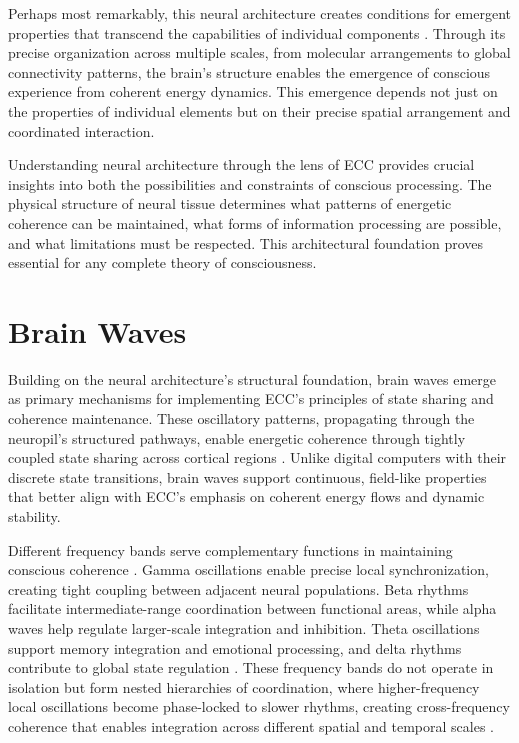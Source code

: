 \begin{refsection}
Perhaps most remarkably, this neural architecture creates conditions for emergent properties that transcend the capabilities of individual components \cite{vonBartheld2016}. Through its precise organization across multiple scales, from molecular arrangements to global connectivity patterns, the brain's structure enables the emergence of conscious experience from coherent energy dynamics. This emergence depends not just on the properties of individual elements but on their precise spatial arrangement and coordinated interaction.

Understanding neural architecture through the lens of ECC provides crucial insights into both the possibilities and constraints of conscious processing. The physical structure of neural tissue determines what patterns of energetic coherence can be maintained, what forms of information processing are possible, and what limitations must be respected. This architectural foundation proves essential for any complete theory of consciousness.

\section{Brain Waves}

Building on the neural architecture's structural foundation, brain waves emerge as primary mechanisms for implementing ECC's principles of state sharing and coherence maintenance. These oscillatory patterns, propagating through the neuropil's structured pathways, enable energetic coherence through tightly coupled state sharing across cortical regions \cite{Buzsaki2004}. Unlike digital computers with their discrete state transitions, brain waves support continuous, field-like properties that better align with ECC's emphasis on coherent energy flows and dynamic stability.

Different frequency bands serve complementary functions in maintaining conscious coherence \cite{Wang2010}. Gamma oscillations enable precise local synchronization, creating tight coupling between adjacent neural populations. Beta rhythms facilitate intermediate-range coordination between functional areas, while alpha waves help regulate larger-scale integration and inhibition. Theta oscillations support memory integration and emotional processing, and delta rhythms contribute to global state regulation \cite{Steriade2006}. These frequency bands do not operate in isolation but form nested hierarchies of coordination, where higher-frequency local oscillations become phase-locked to slower rhythms, creating cross-frequency coherence that enables integration across different spatial and temporal scales \cite{Canolty2010}.


\end{refsection}
